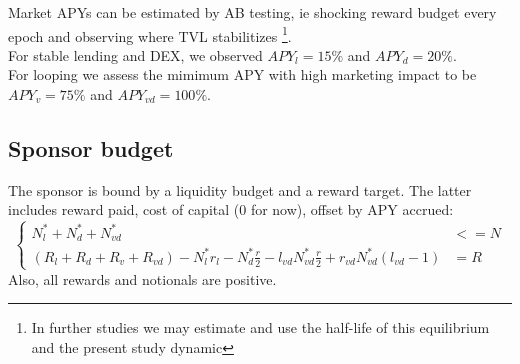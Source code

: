 \documentclass{article}
\begin{document}
    Market APYs can be estimated by AB testing, ie shocking reward budget every epoch and observing where TVL stabilitizes 
    \footnote{In further studies we may estimate and use the half-life of this equilibrium and the present study dynamic}. \\
    For stable lending and DEX, we observed $APY_l=15\%$ and $APY_d=20\%$. \\
    For looping we assess the mimimum APY with high marketing impact to be $APY_v=75\%$ and $APY_{vd}=100\%$.

\subsection{Sponsor budget}

The sponsor is bound by a liquidity budget and a reward target.
The latter includes reward paid, cost of capital (0 for now), offset by APY accrued:
\begin{equation*}
    \left\{
    \begin{aligned}
    N_l^* + N_d^* + N_{vd}^* &<= N\\
    (R_l+R_d+R_v+R_{vd}) - N_l^* r_l - N_d^* \frac{r}{2} 
    - l_{vd} N_{vd}^* \frac{r}{2} + r_{vd} N_{vd}^* (l_{vd}-1) &= R
    \end{aligned}
    \right.
\end{equation*}
Also, all rewards and notionals are positive.
\end{document}
